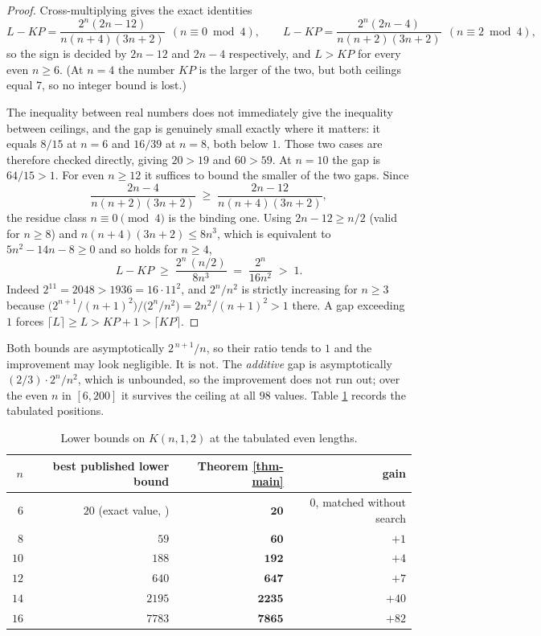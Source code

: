 \documentclass[10pt,a4paper]{article}
\begin{document}
\begin{proof}
Cross-multiplying gives the exact identities
\[
  L-KP=\frac{2^n(2n-12)}{n(n+4)(3n+2)}\ \ (n\equiv 0 \bmod 4),
  \qquad
  L-KP=\frac{2^n(2n-4)}{n(n+2)(3n+2)}\ \ (n\equiv 2\bmod 4),
\]
so the sign is decided by $2n-12$ and $2n-4$ respectively, and $L>KP$ for every
even $n\ge 6$. (At $n=4$ the number $KP$ is the larger of the two, but both
ceilings equal $7$, so no integer bound is lost.)

The inequality between real numbers does not immediately give the inequality
between ceilings, and the gap is genuinely small exactly where it matters: it
equals $8/15$ at $n=6$ and $16/39$ at $n=8$, both below $1$. Those two cases are
therefore checked directly, giving $20>19$ and $60>59$. At $n=10$ the gap is
$64/15>1$. For even $n\ge 12$ it suffices to bound the smaller of the two gaps.
Since
\[
  \frac{2n-4}{n(n+2)(3n+2)}\;\ge\;\frac{2n-12}{n(n+4)(3n+2)},
\]
the residue class $n\equiv 0\pmod 4$ is the binding one. Using $2n-12\ge n/2$
(valid for $n\ge 8$) and $n(n+4)(3n+2)\le 8n^3$, which is equivalent to
$5n^2-14n-8\ge 0$ and so holds for $n\ge 4$,
\[
  L-KP \;\ge\; \frac{2^n\,(n/2)}{8n^3} \;=\; \frac{2^n}{16n^2} \;>\; 1 .
\]
Indeed $2^{11}=2048>1936=16\cdot 11^2$, and $2^n/n^2$ is strictly increasing for
$n\ge 3$ because $\bigl(2^{n+1}/(n+1)^2\bigr)\big/\bigl(2^n/n^2\bigr)
=2n^2/(n+1)^2>1$ there. A gap exceeding $1$ forces
$\lceil L\rceil\ge L>KP+1>\lceil KP\rceil$.
\end{proof}

Both bounds are asymptotically $2^{\,n+1}/n$, so their ratio tends to $1$ and
the improvement may look negligible. It is not. The \emph{additive} gap is
asymptotically $(2/3)\cdot 2^n/n^2$, which is unbounded, so the improvement does
not run out; over the even $n$ in $[6,200]$ it survives the ceiling at all $98$
values. Table \ref{tab-1} records the tabulated positions.

\begin{table}[h]
\centering
\begin{tabular}{r|r|r|r}
$n$ & best published lower bound & Theorem \ref{thm-main} & gain \\ \hline
$6$  & $20$ (exact value, \cite{Seuranen-2007}) & $\mathbf{20}$ & $0$, matched without search \\
$8$  & $59$ \cite{KP-2021} & $\mathbf{60}$ & $+1$ \\
$10$ & $188$ \cite{Seuranen-2007,KP-2021} & $\mathbf{192}$ & $+4$ \\
$12$ & $640$ \cite{KP-2021} & $\mathbf{647}$ & $+7$ \\
$14$ & $2195$ \cite{KP-2021} & $\mathbf{2235}$ & $+40$ \\
$16$ & $7783$ \cite{KP-2021} & $\mathbf{7865}$ & $+82$
\end{tabular}
\caption{Lower bounds on $K(n,1,2)$ at the tabulated even lengths.}
\label{tab-1}
\end{table}
\end{document}

